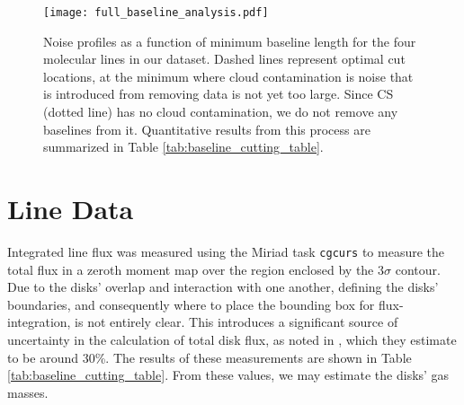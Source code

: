 

\begin{figure}[t]
  \texttt{[image: full\_baseline\_analysis.pdf]}%
  \caption{Noise profiles as a function of minimum baseline length for the four molecular lines in our dataset. Dashed lines represent optimal cut locations, at the minimum where cloud contamination is noise that is introduced from removing data is not yet too large. Since CS (dotted line) has no cloud contamination, we do not remove any baselines from it. Quantitative results from this process are summarized in Table \ref{tab:baseline_cutting_table}.}
  \label{fig:noise_profiles}
\end{figure}





\section{Line Data}
\label{section:line_data}

Integrated line flux was measured using the Miriad task \texttt{cgcurs} to measure the total flux in a zeroth moment map over the region enclosed by the 3$\sigma$ contour. Due to the disks' overlap and interaction with one another, defining the disks' boundaries, and consequently where to place the bounding box for flux-integration, is not entirely clear. This introduces a significant source of uncertainty in the calculation of total disk flux, as noted in \citet{Williams2014}, which they estimate to be around 30\%. The results of these measurements are shown in Table \ref{tab:baseline_cutting_table}. From these values, we may estimate the disks' gas masses.


